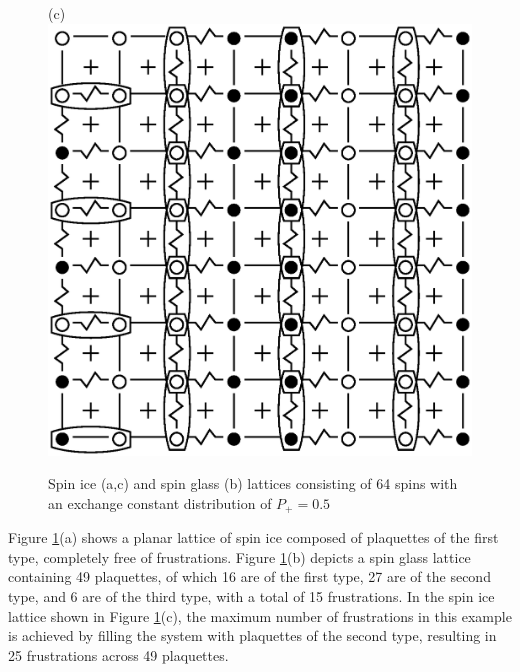 \documentclass[utf8, babel, sor, jor, amsmath, amssymb, reprint]{elsarticle} %
\begin{document}
\begin{figure}[H]
\begin{minipage}[h]{0.3\linewidth}
	\end{minipage}
	\hfill
	\begin{minipage}[h]{0.3\linewidth}
		\centering(c)
		\includegraphics[width=1\linewidth]{pictures/SI_64_J0}
	\end{minipage}
	\hfill
	\caption{Spin ice (a,c) and spin glass (b) lattices consisting of 64 spins with an exchange constant distribution of $P_+ = 0.5$}
	\label{fig:cell_SI_SG_64}

\end{figure}


Figure \ref{fig:cell_SI_SG_64}(a) shows a planar lattice of spin ice composed of plaquettes of the first type, completely free of frustrations.
Figure \ref{fig:cell_SI_SG_64}(b) depicts a spin glass lattice containing 49 plaquettes, of which 16 are of the first type, 27 are of the second type, and 6 are of the third type, with a total of 15 frustrations.
In the spin ice lattice shown in Figure \ref{fig:cell_SI_SG_64}(c), the maximum number of frustrations in this example is achieved by filling the system with plaquettes of the second type, resulting in 25 frustrations across 49 plaquettes.
\end{document}
